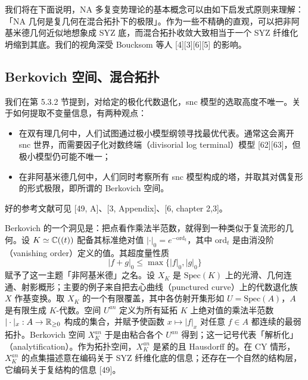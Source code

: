
我们将在下面说明，NA 多复变势理论的基本概念可以由如下启发式原则来理解：「NA 几何是复几何在混合拓扑下的极限」。作为一些不精确的直观，可以把非阿基米德几何近似地想象成 SYZ 底，而混合拓扑收敛大致相当于一个 SYZ 纤维化坍缩到其底。我们的视角深受 Boucksom 等人 [4][3][6][5] 的影响。

\subsection{Berkovich 空间、混合拓扑}
我们在第 5.3.2 节提到，对给定的极化代数退化，snc 模型的选取高度不唯一。关于如何提取不变量信息，有两种观点：
\begin{itemize}
\item 在双有理几何中，人们试图通过极小模型纲领寻找最优代表。通常这会离开 snc 世界，而需要因子化对数终端（divisorial log terminal）模型 [62][63]，但极小模型仍可能不唯一；
\item 在非阿基米德几何中，人们同时考察所有 snc 模型构成的塔，并取其对偶复形的形式极限，即所谓的 Berkovich 空间。
\end{itemize}
好的参考文献可见 [49, A]、[3, Appendix]、[6, chapter 2,3]。

Berkovich 的一个洞见是：把点看作乘法半范数，就得到一种类似于复流形的几何。设 $K\simeq\mathbb{C}((t))$ 配备其标准绝对值 $|\cdot|_0=e^{-\mathrm{ord}_t}$，其中 $\mathrm{ord}_t$ 是由消没阶（vanishing order）定义的值。其超度量性质
\[
|f+g|_0\le\max\{|f|_0,|g|_0\}
\]
赋予了这一主题「非阿基米德」之名。设 $X_K$ 是 $\mathrm{Spec}(K)$ 上的光滑、几何连通、射影概形；主要的例子来自把去心曲线（punctured curve）上的代数退化族 $X$ 作基变换。取 $X_K$ 的一个有限覆盖，其中各仿射开集形如 $U=\mathrm{Spec}(A)$，$A$ 是有限生成 $K$-代数。空间 $U^{an}$ 定义为所有延拓 $K$ 上绝对值的乘法半范数 $|\cdot|_x:A\to\mathbb{R}_{\ge 0}$ 构成的集合，并赋予使函数 $x\mapsto|f|_x$ 对任意 $f\in A$ 都连续的最弱拓扑。Berkovich 空间 $X_K^{an}$ 于是由粘合各个 $U^{an}$ 得到；这一记号代表「解析化」（analytification）。作为拓扑空间，$X_K^{an}$ 是紧的且 Hausdorff 的。在 CY 情形，$X_K^{an}$ 的点集描述意在编码关于 SYZ 纤维化底的信息；还存在一个自然的结构层，它编码关于复结构的信息 [49]。


